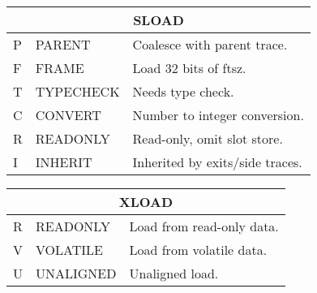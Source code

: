 \begin{table}
\centering
\begin{tabular}{|l|l|l|}
\hline
\multicolumn{3}{|c|}{SLOAD}\\\hline
P & PARENT    & Coalesce with parent trace.\\
F & FRAME     & Load 32 bits of ftsz.\\
T & TYPECHECK & Needs type check.\\
C & CONVERT   & Number to integer conversion.\\
R & READONLY  & Read-only, omit slot store.\\
I & INHERIT   & Inherited by exits/side traces.\\
\hline
\end{tabular}
\end{table}
\begin{table}
\centering
\begin{tabular}{|l|l|l|}
\hline
\multicolumn{3}{|c|}{XLOAD}\\\hline
R & READONLY  & Load from read-only data.\\
V & VOLATILE  & Load from volatile data.\\
U & UNALIGNED & Unaligned load.\\
\hline
\end{tabular}
\end{table}
